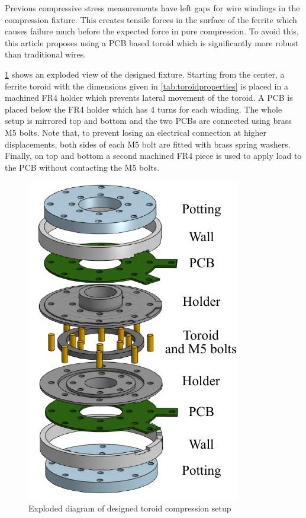 \documentclass[conference]{IEEEtran}
\begin{document}
Previous compressive stress measurements have left gaps for wire windings in the compression fixture.
This creates tensile forces in the surface of the ferrite which causes failure much before the expected force in pure compression. 
To avoid this, this article proposes using a PCB based toroid which is significantly more robust than traditional wires. 

\cref{fig:compressionholder} shows an exploded view of the designed fixture. 
Starting from the center, a ferrite toroid with the dimensions given in \cref{tab:toroidproperties} is placed in a machined FR4 holder which prevents lateral movement of the toroid. 
A PCB is placed below the FR4 holder which has 4 turns for each winding. 
The whole setup is mirrored top and bottom and the two PCBs are connected using brass M5 bolts. 
Note that, to prevent losing an electrical connection at higher displacements, both sides of each M5 bolt are fitted with brass spring washers. 
Finally, on top and bottom a second machined FR4 piece is used to apply load to the PCB without contacting the M5 bolts. 

\begin{figure}[t]
  \centering
  \includegraphics{figures/compressionholder.pdf}
  \caption{Exploded diagram of designed toroid compression setup}
  \label{fig:compressionholder}
\end{figure}
\end{document}
